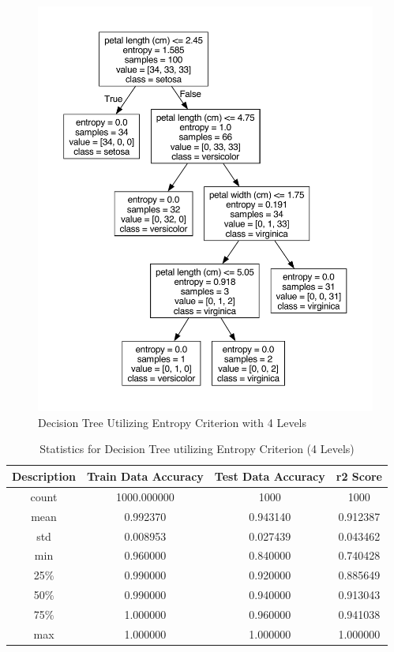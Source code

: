 \documentclass[journal]{IEEEtran}
\begin{document}
\begin{figure}[h!]
\includegraphics[scale=0.3]{iris-entropy-4levels.pdf}
\centering
\caption{Decision Tree Utilizing Entropy Criterion with 4 Levels}
\label{fig:dtEn4}
\end{figure}

\begin{table}[h!]
\centering
\begin{tabular}{ c | c c c }
    Description & Train Data Accuracy & Test Data Accuracy & r2 Score \\ 
\hline
count     &     1000.000000     &    1000  &1000\\
mean      &        0.992370    &        0.943140   &  0.912387\\
std       &        0.008953    &        0.027439   &  0.043462\\
min      &         0.960000    &        0.840000   &  0.740428\\
25\%      &         0.990000    &        0.920000  &   0.885649\\
50\%      &         0.990000    &        0.940000  &   0.913043\\
75\%      &         1.000000    &        0.960000  &   0.941038\\
max       &        1.000000     &       1.000000   &  1.000000
\end{tabular}
\caption{Statistics for Decision Tree utilizing Entropy Criterion (4 Levels)}
\label{table:dtEn4}
\end{table}
\end{document}
